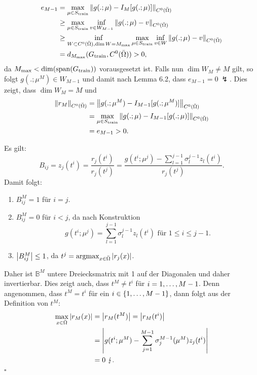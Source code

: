 \begin{align*}
e_{M-1} &= \max\limits_{\mu\in S_{\operatorname{train}}} \left\Vert g(.;\mu) - I_M[g(.;\mu)]\right\Vert_{C^0(\bar{\Omega})}\\
&\ge \max\limits_{\mu\in S_{\operatorname{train}}} \inf\limits_{v\in W_{M-1}} \left\Vert g(.;\mu) - v\right\Vert_{C^0(\bar{\Omega})}\\
&\ge \inf\limits_{W \subset C^0(\bar{\Omega}), \dim W = M_{\max}} \max\limits_{\mu\in S_{\operatorname{train}}} \inf\limits_{v\in W} \left\Vert g(.;\mu) - v\right\Vert_{C^0(\bar{\Omega})}\\
&= d_{M_{\max}} ( G_{\operatorname{train}}, C^0(\bar{\Omega})) > 0,
\end{align*}
da $M_{\max} < \dim (\operatorname{span} (G_{\operatorname{train}}))$ vorausgesetzt ist.
Falls nun $\dim W_M\neq M$ gilt, so folgt $g(.;\mu^M)\in W_{M-1}$ und damit nach Lemma 6.2, dass $e_{M-1} = 0~\lightning$.
Dies zeigt, dass $\dim W_M=M$ und
\begin{align*}
\left\Vert r_M\right\Vert_{C^0(\bar{\Omega})} &= \left\Vert g(.;\mu^M) - I_{M-1}[g(.;\mu^M)]\right\Vert_{C^0(\bar{\Omega})}\\
&= \max\limits_{\mu\in S_{\operatorname{train}}} \left\Vert g(.;\mu) - I_{M-1}[g(.;\mu)]\right\Vert_{C^0(\bar{\Omega})}\\
&= e_{M-1} > 0.
\end{align*}

 Es gilt:
\[
B_{ij} = z_j(t^i) = \frac{r_j(t^i)}{r_j(t^j)} = \frac{g(t^i; \mu^j) - \sum_{l=1}^{j-1} \sigma_l^{j-1} z_l(t^i) }{r_j(t^j)}.
\]
Damit folgt:
\begin{enumerate}[(1)]
	\item $B_{ij}^M = 1$ für $i=j$.
	\item $B_{ij}^M = 0$ für $i<j$, da nach Konstruktion
	\[
	g(t^i; \mu^j) = \sum_{l=1}^{j-1} \sigma_l^{j-1} z_l(t^i) \text{ für } 1\le i\le j-1.
	\]
	\item $\left\vert B_{ij}^M\right\vert\le 1$, da $t^j= \operatorname{argmax}_{x\in \bar{\Omega}} \left\vert r_j(x)\right\vert$.
\end{enumerate}
Daher ist $\mathbb{B}^M$ untere Dreiecksmatrix mit 1 auf der Diagonalen und daher invertierbar.
Dies zeigt auch, dass $t^M \neq t^i$ für $i=1, \dots ,M-1$.
Denn angenommen, dass $t^M = t^i$ für ein $i\in \left\{1, \dots ,M-1\right\}$, dann folgt aus der Definition von $t^M$:
\begin{align*}
\max\limits_{x\in \bar{\Omega}} \left\vert r_M(x)\right\vert &= \left\vert r_M(t^M)\right\vert = \left\vert r_M(t^i)\right\vert\\
&= \left\vert g(t^i;\mu^M) - \sum_{j=1}^{M-1} \sigma_j^{M-1}(\mu^M) z_j(t^i)\right\vert\\
&= 0 ~\lightning.
\end{align*}
\hfill $\square$

